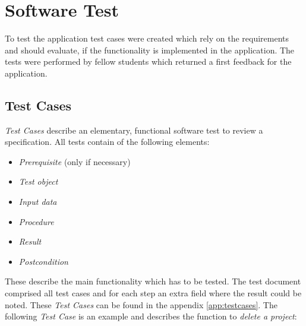 \chapter{Software Test}

To test the application test cases were created which rely on the requirements and should evaluate, if the functionality is implemented in the application. The tests were performed by fellow students which returned a first feedback for the application.

\section{Test Cases}

\textit{Test Cases} describe an elementary, functional software test to review a specification. All tests contain of the following elements:
\begin{itemize}
	\item \textit{Prerequisite} (only if necessary)
	\item \textit{Test object}
	\item \textit{Input data}
	\item \textit{Procedure}
	\item \textit{Result}
	\item \textit{Postcondition}
\end{itemize}
These describe the main functionality which has to be tested. The test document comprised all test cases and for each step an extra field where the result could be noted. These \textit{Test Cases} can be found in the appendix \ref{app:testcases}. The following \textit{Test Case} is an example and describes the function to \textit{delete a project}:

